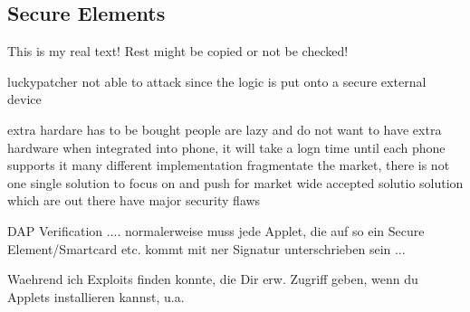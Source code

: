 \subsection{Secure Elements}\label{subsection:evaluation-external-secure}
This is my real text! Rest might be copied or not be checked!

luckypatcher not able to attack since the logic is put onto a secure external device

extra hardare has to be bought
people are lazy and do not want to have extra hardware
when integrated into phone, it will take a logn time until each phone supports it
many different implementation fragmentate the market, there is not one single solution to focus on and push for market wide accepted solutio
solution which are out there have major security flaws


DAP Verification .... normalerweise muss jede Applet, die auf so ein Secure Element/Smartcard etc. kommt mit ner Signatur unterschrieben sein ...


Waehrend ich Exploits finden konnte, die Dir erw. Zugriff geben, wenn du Applets installieren kannst, u.a.
